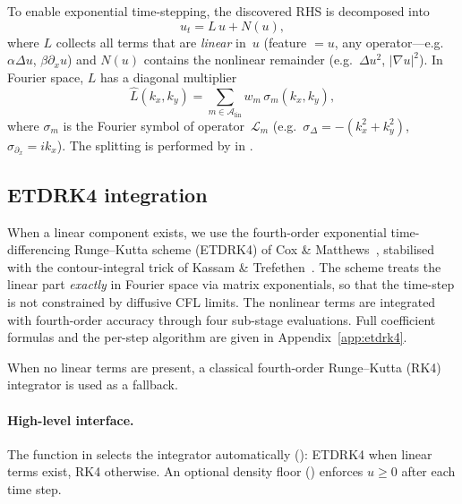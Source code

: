 \documentclass{report}
\theoremstyle{plain}
\theoremstyle{remark}
\numberwithin{equation}{section}              %
\begin{document}
To enable exponential time-stepping, the discovered RHS is decomposed into
\begin{equation}
  u_t = L\,u + N(u),
  \label{eq:lin_nonlin_split}
\end{equation}
where $L$ collects all terms that are \emph{linear} in~$u$ (feature $=u$,
any operator---e.g.\ $\alpha\Delta u$, $\beta\partial_x u$) and $N(u)$
contains the nonlinear remainder (e.g.\ $\Delta u^2$, $|\nabla u|^2$).
In Fourier space, $L$ has a diagonal multiplier
\begin{equation}
  \hat{L}(k_x,k_y)
  = \sum_{m\in\mathcal{A}_{\mathrm{lin}}} w_m\,\sigma_m(k_x,k_y),
  \label{eq:L_hat}
\end{equation}
where $\sigma_m$ is the Fourier symbol of operator~$\mathcal{L}_m$
(e.g.\ $\sigma_{\Delta}=-(k_x^2+k_y^2)$, $\sigma_{\partial_x}=ik_x$).
The splitting is performed by  in
.

\subsection{ETDRK4 integration}
\label{subsec:etdrk4}

When a linear component exists, we use the fourth-order exponential
time-differencing Runge--Kutta scheme (ETDRK4) of Cox \&
Matthews~\cite{cox2002etdrk}, stabilised with the contour-integral trick
of Kassam \& Trefethen~\cite{kassam2005etdrk4}.  The scheme treats the
linear part \emph{exactly} in Fourier space via matrix exponentials, so
that the time-step is not constrained by diffusive CFL limits.  The
nonlinear terms are integrated with fourth-order accuracy through four
sub-stage evaluations.  Full coefficient formulas and the per-step
algorithm are given in Appendix~\ref{app:etdrk4}.

When no linear terms are present, a classical fourth-order Runge--Kutta
(RK4) integrator is used as a fallback.

\paragraph{High-level interface.}
The function  in 
selects the integrator automatically (): ETDRK4 when
linear terms exist, RK4 otherwise.  An optional density floor
() enforces $u\ge 0$ after each time step.
\fi
 
\end{document}
